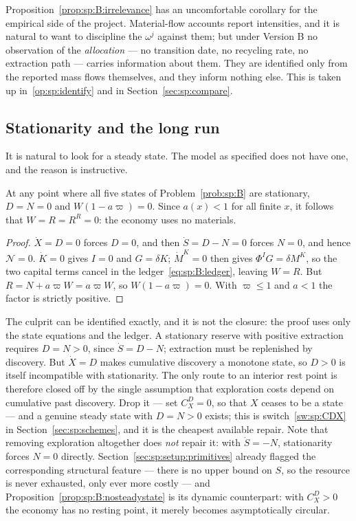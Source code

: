 Proposition~\ref{prop:sp:B:irrelevance} has an uncomfortable corollary for the empirical side of the
project. Material-flow accounts report intensities, and it is natural to want to discipline the
$\omega^j$ against them; but under Version B no observation of the \emph{allocation} --- no transition
date, no recycling rate, no extraction path --- carries information about them. They are identified only
from the reported mass flows themselves, and they inform nothing else. This is taken up
in~\ref{op:sp:identify} and in Section~\ref{sec:sp:compare}.


\subsection{Stationarity and the long run}\label{sec:sp:B:longrun}

It is natural to look for a steady state. The model as specified does not have one, and the reason is
instructive.

\begin{proposition}\label{prop:sp:B:nosteadystate}
At any point where all five states of Problem~\ref{prob:sp:B} are stationary, $D=N=0$ and
$W\left(1-a\varpi\right)=0$. Since $a(x)<1$ for all finite $x$, it follows that $W=R=R^R=0$: the economy
uses no materials.
\end{proposition}

\begin{proof}
$\dot X=D=0$ forces $D=0$, and then $\dot S=D-N=0$ forces $N=0$, and hence $\mathcal N=0$. $\dot K=0$
gives $I=0$ and $G=\delta K$; $\dot M^K=0$ then gives $\Phi^IG=\delta M^K$, so the two capital terms
cancel in the ledger~\eqref{eq:sp:B:ledger}, leaving $W=R$. But $R=N+a\varpi W=a\varpi W$, so
$W\left(1-a\varpi\right)=0$. With $\varpi\le1$ and $a<1$ the factor is strictly positive.
\end{proof}

The culprit can be identified exactly, and it is not the closure: the proof uses only the state
equations and the ledger. A stationary reserve with positive extraction requires $D=N>0$, since
$\dot S=D-N$; extraction must be replenished by discovery. But $\dot X=D$ makes cumulative discovery a
monotone state, so $D>0$ is itself incompatible with stationarity. The only route to an interior rest
point is therefore closed off by the single assumption that exploration costs depend on cumulative past
discovery. Drop it --- set $C^D_X=0$, so that $X$ ceases to be a state --- and a genuine steady state
with $D=N>0$ exists; this is switch~\ref{sw:sp:CDX} in Section~\ref{sec:sp:schemes}, and it is the
cheapest available repair. Note that removing exploration altogether does \emph{not} repair it: with
$\dot S=-N$, stationarity forces $N=0$ directly. Section~\ref{sec:sp:setup:primitives} already flagged
the corresponding structural feature --- there is no upper bound on $S$, so the resource is never
exhausted, only ever more costly --- and Proposition~\ref{prop:sp:B:nosteadystate} is its dynamic
counterpart: with $C^D_X>0$ the economy has no resting point, it merely becomes asymptotically
circular.


